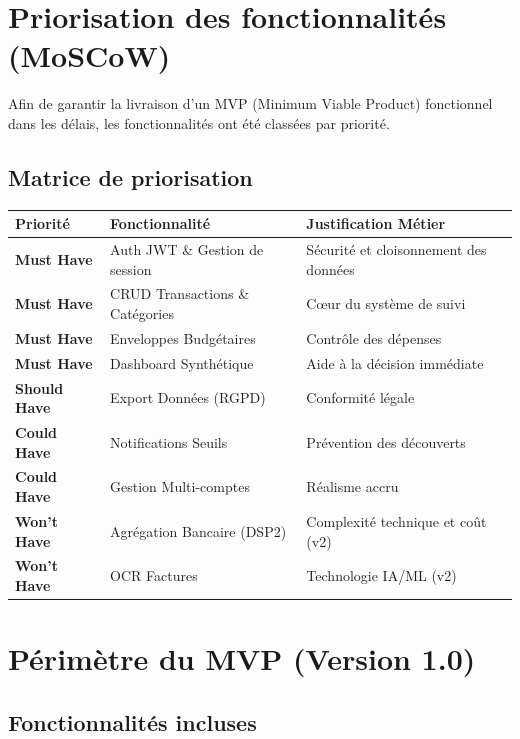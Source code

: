 \section{Priorisation des fonctionnalités (MoSCoW)}

Afin de garantir la livraison d'un MVP (Minimum Viable Product) fonctionnel dans les délais, les fonctionnalités ont été classées par priorité.

\subsection{Matrice de priorisation}

\begin{center}
\small
\begin{tabular}{|p{}|p{}|p{}|}
\hline
\textbf{Priorité} & \textbf{Fonctionnalité} & \textbf{Justification Métier} \\
\hline
\rowcolor{green!10} \textbf{Must Have} & Auth JWT \& Gestion de session & Sécurité et cloisonnement des données \\
\hline
\rowcolor{green!10} \textbf{Must Have} & CRUD Transactions \& Catégories & Cœur du système de suivi \\
\hline
\rowcolor{green!10} \textbf{Must Have} & Enveloppes Budgétaires & Contrôle des dépenses \\
\hline
\rowcolor{green!10} \textbf{Must Have} & Dashboard Synthétique & Aide à la décision immédiate \\
\hline
\textbf{Should Have} & Export Données (RGPD) & Conformité légale \\
\hline
\textbf{Could Have} & Notifications Seuils & Prévention des découverts \\
\hline
\textbf{Could Have} & Gestion Multi-comptes & Réalisme accru \\
\hline
\rowcolor{red!5} \textbf{Won't Have} & Agrégation Bancaire (DSP2) & Complexité technique et coût (v2) \\
\hline
\rowcolor{red!5} \textbf{Won't Have} & OCR Factures & Technologie IA/ML (v2) \\
\hline
\end{tabular}
\end{center}

\section{Périmètre du MVP (Version 1.0)}

\subsection{Fonctionnalités incluses}

